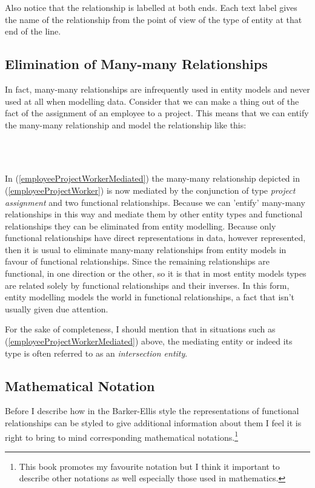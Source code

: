 \begin{gather}
\label{employeeProjectWorker}
\raisebox{-1cm}{

}
\end{gather}

\noindent Also notice that the relationship is labelled at both ends. Each text label gives the name of the relationship from the point of view of the type of entity at that end of the line.

\subsection*{Elimination of Many-many Relationships}
\noindent In fact, many-many relationships are infrequently used in entity models and never used at all when modelling data.
Consider that we can make a thing out of the fact of the assignment of an employee to a project. This means that we can entify the many-many relationship and model the relationship like this:
\begin{gather}
\label{employeeProjectWorkerMediated}
\raisebox{-1cm}{

}
\end{gather}
\noindent
In (\ref{employeeProjectWorkerMediated}) the  many-many relationship depicted in (\ref{employeeProjectWorker}) is now mediated by the conjunction of  type
\textit{project assignment} and two functional relationships. Because we can 'entify' many-many relationships in this way and mediate them by other entity types and functional relationships they can be eliminated from entity modelling. Because only functional relationships have direct representations in data, however represented, then it is usual to eliminate many-many relationships from entity models in favour of functional relationships. Since the remaining relationships are functional, in one direction or the other, so it is that in most entity models types are related solely by functional relationships and their inverses. In this form, entity modelling models the world in functional relationships, a fact that isn't usually given due attention.

\mynote For the sake of completeness, I should mention that in situations
such as (\ref{employeeProjectWorkerMediated}) above, the mediating entity or indeed its type is often referred to as an \textit{intersection entity}.

\subsection*{Mathematical Notation}
\mynote
Before I describe how in the Barker-Ellis style the representations of functional relationships can be styled to give additional information about them  I feel it is right to bring to mind corresponding mathematical notations.\footnote{This book promotes my favourite notation but I think it important to describe other notations as well especially those used in mathematics.}


